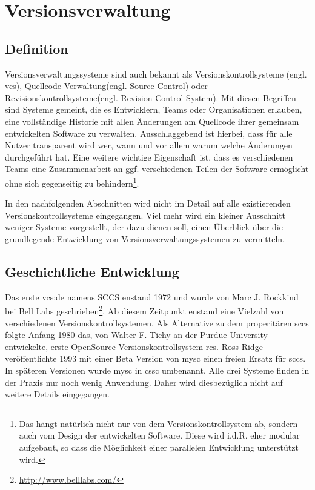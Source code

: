 \chapter{Versionsverwaltung}\label{cha:Versionsverwaltung}
\section{Definition}\label{sec:Definition}
Versionsverwaltungssysteme sind auch bekannt als Versionskontrollsysteme (engl.
\acrlong{vcs}), Quellcode Verwaltung(engl. Source Control) oder
Revisionskontrollsysteme(engl. Revision Control System). Mit diesen Begriffen
sind Systeme gemeint, die es Entwicklern, Teams oder Organisationen erlauben,
eine vollständige Historie mit allen Änderungen am Quellcode ihrer gemeinsam
entwickelten Software zu verwalten. Ausschlaggebend ist hierbei, dass für alle
Nutzer transparent wird wer, wann und vor allem warum welche Änderungen
durchgeführt hat. Eine weitere wichtige Eigenschaft ist, dass es verschiedenen
Teams eine Zusammenarbeit an ggf. verschiedenen Teilen der Software ermöglicht
ohne sich gegenseitig zu behindern\footnote{Das hängt natürlich
nicht nur von dem Versionskontrollsystem ab, sondern auch vom Design der
entwickelten Software.  Diese wird i.d.R. eher modular aufgebaut, so dass die
Möglichkeit einer parallelen Entwicklung unterstützt wird.}.\cite[S.~381]{cd}

In den nachfolgenden Abschnitten wird nicht im Detail auf alle existierenden
Versionskontrollsysteme eingegangen. Viel mehr wird ein kleiner Ausschnitt
weniger Systeme vorgestellt, der dazu dienen soll, einen Überblick über die
grundlegende Entwicklung von Versionsverwaltungssystemen zu vermitteln.

\section{Geschichtliche Entwicklung}\label{sec:GeschichtlicheEntwicklung}
Das erste \gls{vcs:de} namens SCCS enstand 1972 und wurde von Marc J.  Rockkind
bei Bell Labs
geschrieben\footnote{\url{http://www.belllabs.com/}}\cite[S.~382]{cd}. Ab
diesem Zeitpunkt enstand eine Vielzahl von verschiedenen
Versionskontrollsystemen. Als Alternative zu dem properitären \acrshort{sccs}
folgte Anfang 1980 das, von Walter F. Tichy an der Purdue University
entwickelte, erste \acrlong{OpenSource} Versionskontrollsystem
\acrfull{rcs}\cite{paper:rcs,link:rcs}. Ross Ridge veröffentlichte 1993 mit
einer Beta Version von \acrshort{mysc} einen freien Ersatz für \acrshort{sccs}.
In späteren Versionen wurde \acrshort{mysc} in \acrfull{cssc}
umbenannt\cite{link:cssc,link:mysc}. Alle drei Systeme finden in der Praxis nur
noch wenig Anwendung. Daher wird diesbezüglich nicht auf weitere Details
eingegangen.

